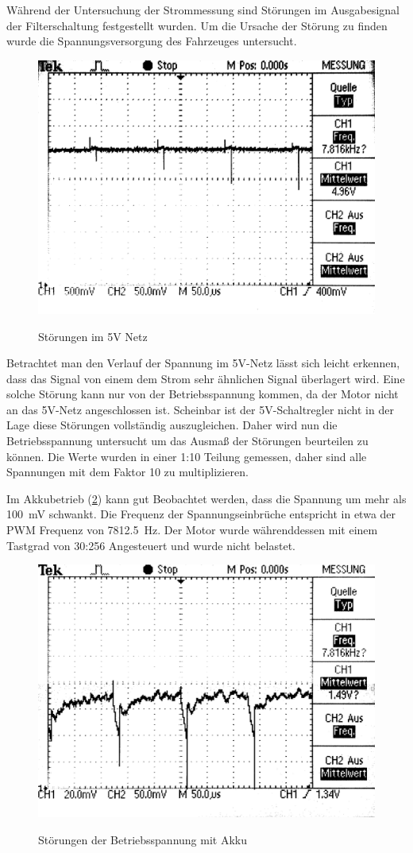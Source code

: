 Während der Untersuchung der Strommessung sind Störungen im Ausgabesignal der Filterschaltung festgestellt wurden. Um die Ursache der Störung zu finden wurde die Spannungsversorgung
des Fahrzeuges untersucht.

\begin{figure}[H]
\centering
\includegraphics[width=.8\textwidth]{5V_supply.png}\\
\caption{Störungen im 5V Netz}%
\label{fig:5V Supply}
\end{figure}

Betrachtet man den Verlauf der Spannung im 5V-Netz lässt sich leicht erkennen, dass das Signal von einem dem Strom sehr ähnlichen Signal überlagert wird.
Eine solche Störung kann nur von der Betriebsspannung kommen, da der Motor nicht an das 5V-Netz angeschlossen ist. Scheinbar ist der 5V-Schaltregler nicht in der Lage diese Störungen vollständig auszugleichen.
Daher wird nun die Betriebsspannung untersucht um das Ausmaß der Störungen beurteilen zu können.
Die Werte wurden in einer 1:10 Teilung gemessen, daher sind alle Spannungen mit dem Faktor 10 zu multiplizieren.

Im Akkubetrieb (\cref{fig:accu_supply}) kann gut Beobachtet werden, dass die Spannung um mehr als \SI{100}{\mV} schwankt. Die Frequenz der Spannungseinbrüche entspricht in etwa
der PWM Frequenz von \SI{7812,5}{\hertz}.  Der Motor wurde währenddessen mit einem Tastgrad von 30:256 Angesteuert und wurde nicht belastet.


\begin{figure}[H]
\centering
\includegraphics[width=.8\textwidth]{VCC_AKKU.png}\\
\caption{Störungen der Betriebsspannung mit Akku}%
\label{fig:accu_supply}
\end{figure}


